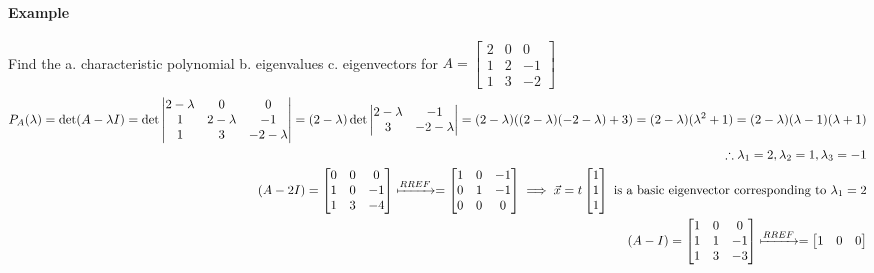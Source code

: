 \paragraph*{Example}
Find the a. characteristic polynomial b. eigenvalues c. eigenvectors for $A = \begin{bmatrix}
    2 & 0 & 0 \\
    1 & 2 & -1 \\
    1 & 3 & -2
\end{bmatrix}$
\begin{align*}
    P_A(\lambda) = \det(A - \lambda I) = \det\begin{vmatrix}
        2 - \lambda & 0 & 0 \\
        1 & 2 - \lambda & -1 \\
        1 & 3 & -2 - \lambda
    \end{vmatrix} = (2 - \lambda) \det\begin{vmatrix}
        2 - \lambda & -1 \\
        3 & -2 - \lambda
    \end{vmatrix} = (2 - \lambda) ((2 - \lambda)(-2 - \lambda) + 3) = (2 - \lambda)(\lambda^2 + 1) = (2-\lambda)(\lambda - 1)(\lambda + 1)\\
    \therefore \lambda_1 = 2, \lambda_2 = 1, \lambda_3 = -1\\
    (A - 2I) = \begin{bmatrix}
    0 & 0 & 0 \\
    1 & 0 & -1 \\
    1 & 3 & -4
    \end{bmatrix} \xmapsto{RREF} = \begin{bmatrix}
    1 & 0 & -1 \\
    0 & 1 & -1 \\
    0 & 0 & 0
\end{bmatrix} \implies \vec{x} = t \begin{bmatrix}
    1 \\
    1 \\
    1
\end{bmatrix} \text{ is a basic eigenvector corresponding to } \lambda_1 = 2 \\
    (A - I) = \begin{bmatrix}
    1 & 0 & 0 \\
    1 & 1 & -1 \\
    1 & 3 & -3
    \end{bmatrix} \xmapsto{RREF} = \begin{bmatrix}
    1 & 0 & 0 \\

\end{bmatrix}
\end{align*}
